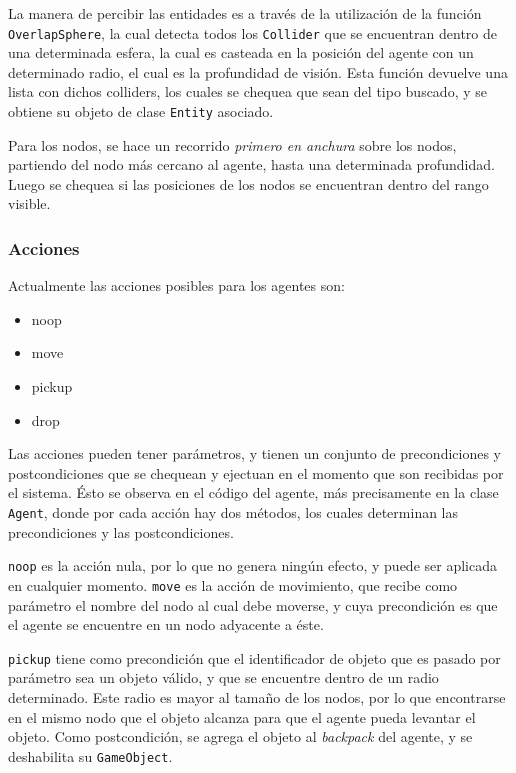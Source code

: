 \documentclass[a4paper,oneside]{article}
\begin{document}
La manera de percibir las entidades es a través de la utilización de la función
\texttt{OverlapSphere}, la cual detecta todos los \texttt{Collider} que se encuentran 
dentro de una determinada esfera, la cual es casteada en la posición del agente con un
determinado radio, el cual es la profundidad de visión. Esta función devuelve una lista
con dichos colliders, los cuales se chequea que sean del tipo buscado, y se obtiene su
objeto de clase \texttt{Entity} asociado. 

Para los nodos, se hace un recorrido \textit{primero en anchura} sobre los nodos, 
partiendo del nodo más cercano al agente, hasta una determinada profundidad. Luego se 
chequea si las posiciones de los nodos se encuentran dentro del rango visible.

\subsubsection{Acciones}

Actualmente las acciones posibles para los agentes son:

\begin{itemize}
\ttfamily
\item noop
\item move
\item pickup
\item drop
\end{itemize}

Las acciones pueden tener parámetros, y tienen un conjunto de precondiciones y 
postcondiciones que se 
chequean y ejectuan en el momento que son recibidas por el sistema. Ésto se observa en
el código del agente, más precisamente en la clase \texttt{Agent}, donde por cada acción
hay dos métodos, los cuales determinan las precondiciones y las postcondiciones.

\texttt{noop} es la acción nula, por lo que no genera ningún efecto, y puede ser aplicada 
en cualquier momento. \texttt{move} es la acción de movimiento, que recibe como 
parámetro el nombre del nodo al cual debe moverse, y cuya precondición es que el agente
se encuentre en un nodo adyacente a éste.

\texttt{pickup} tiene como precondición que el identificador de objeto que es pasado por 
parámetro sea un objeto válido, y que se encuentre dentro de un radio determinado. Este
radio es mayor al tamaño de los nodos, por lo que encontrarse en el mismo nodo que el 
objeto alcanza para que el agente pueda levantar el objeto. Como postcondición, se 
agrega el objeto al \textit{backpack} del agente, y se deshabilita su 
\texttt{GameObject}.
\end{document}
